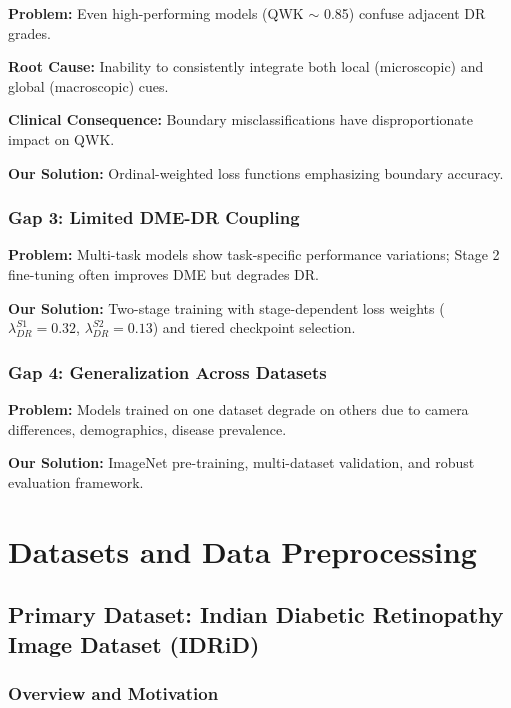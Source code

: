 \documentclass[12pt,a4paper]{article}
\begin{document}
\textbf{Problem:}
Even high-performing models (QWK $\sim$ 0.85) confuse adjacent DR grades.

\textbf{Root Cause:}
Inability to consistently integrate both local (microscopic) and global (macroscopic) cues.

\textbf{Clinical Consequence:}
Boundary misclassifications have disproportionate impact on QWK.

\textbf{Our Solution:}
Ordinal-weighted loss functions emphasizing boundary accuracy.

\subsubsection{Gap 3: Limited DME-DR Coupling}

\textbf{Problem:}
Multi-task models show task-specific performance variations; Stage 2 fine-tuning often improves DME but degrades DR.

\textbf{Our Solution:}
Two-stage training with stage-dependent loss weights ($\lambda_{DR}^{S1}=0.32$, $\lambda_{DR}^{S2}=0.13$) and tiered checkpoint selection.

\subsubsection{Gap 4: Generalization Across Datasets}

\textbf{Problem:}
Models trained on one dataset degrade on others due to camera differences, demographics, disease prevalence.

\textbf{Our Solution:}
ImageNet pre-training, multi-dataset validation, and robust evaluation framework.

\newpage

\section{Datasets and Data Preprocessing}

\subsection{Primary Dataset: Indian Diabetic Retinopathy Image Dataset (IDRiD)}

\subsubsection{Overview and Motivation}
\end{document}
